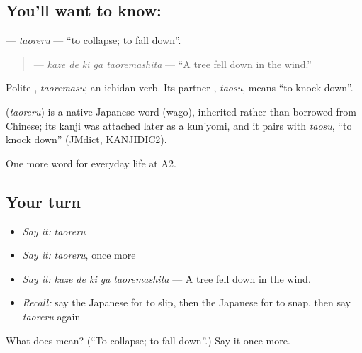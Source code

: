 \subsection*{You'll want to know: }
\textbf{} — \emph{taoreru} — \textquotedblleft{}to collapse; to fall down\textquotedblright{}.

\begin{quote}
\textbf{  } — \emph{kaze de ki ga taoremashita} — \textquotedblleft{}A tree fell down in the wind.\textquotedblright{}
\end{quote}

Polite \textbf{}, \emph{taoremasu}; an ichidan verb. Its partner \textbf{}, \emph{taosu}, means \textquotedblleft{}to knock down\textquotedblright{}.

\begin{cousinweb}
\textbf{} (\emph{taoreru}) is a native Japanese word (wago), inherited rather than borrowed from Chinese; its kanji was attached later as a kun'yomi, and it pairs with \emph{taosu}, \textquotedblleft{}to knock down\textquotedblright{} (JMdict, KANJIDIC2).
\end{cousinweb}

\begin{grammarlens}[title={What you've built}]
One more word for everyday life at A2.
\end{grammarlens}

\subsection*{Your turn}
\begin{itemize}
\raggedright
  \item \emph{Say it:} \emph{taoreru}
  \item \emph{Say it:} \emph{taoreru}, once more
  \item \emph{Say it:} \emph{kaze de ki ga taoremashita} — A tree fell down in the wind.
  \item \emph{Recall:} say the Japanese for to slip, then the Japanese for to snap, then say \emph{taoreru} again
\end{itemize}

\begin{tcolorbox}[breakable,colback=teal!4,colframe=teal!35!black,title={Before you move on}]
What does  mean? (\textquotedblleft{}To collapse; to fall down\textquotedblright{}.) Say it once more.
\end{tcolorbox}
